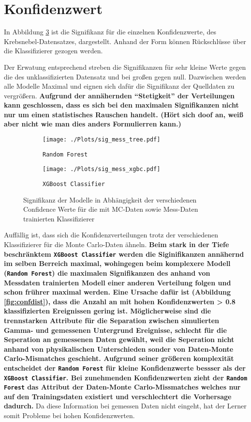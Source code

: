 \section{Konfidenzwert}
In Abbildung \ref{fig:signconf} ist die Signifikanz für die einzelnen Konfidenzwerte, des Krebsnebel-Datensatzes, dargestellt. 
Anhand der Form können Rückschlüsse über die Klassifizierer gezogen werden. 

Der Erwatung entsprechend streben die Signifikanzen für sehr kleine Werte gegen die des unklassifizierten Datensatz und bei großen gegen null.
Dazwischen werden alle Modelle Maximal und eignen sich dafür die Signifikanz der Quelldaten zu vergrößern.
\textbf{Aufgrund der annähernden \enquote{Stetigkeit} der Verteilungen kann geschlossen, dass es sich bei den maximalen Signifikanzen nicht nur  um einen statistisches Rauschen handelt. (Hört sich doof an, weiß aber nicht wie man dies anders Formulierren kann.)}
\begin{figure}[H]
  \centering
  \begin{subfigure}[b]{0.48\textwidth}
  \centering
  \texttt{[image: ./Plots/sig\_mess\_tree.pdf]}
  \caption{\texttt{Random Forest}}
  \label{fig:signconfMC}
\end{subfigure}
\begin{subfigure}[b]{0.48\textwidth}
  \centering
  \texttt{[image: ./Plots/sig\_mess\_xgbc.pdf]}
  \caption{\texttt{XGBoost Classifier}}
  \label{fig:signconfMESS}
\end{subfigure}
\caption{Signifikanz der Modelle in Abhängigkeit der verschiedenen Confidence Werte für die mit MC-Daten sowie Mess-Daten trainierten Klassifizierer}
\label{fig:signconf}
\end{figure}

Auffällig ist, dass sich die Konfidenzverteilungen trotz der verschiedenen Klassifizierer für die Monte Carlo-Daten ähneln.
\textbf{Beim stark in der Tiefe beschränktem \texttt{XGBoost Classifier} werden die Siginifikanzen annähernd im selben Berreich maximal, wohingegen beim komplexere Modell (\texttt{Random Forest}) die maximalen Signifikanzen des anhand von Messdaten trainierten Modell einer anderen Verteilung folgen und schon frührer maximal werden. 
Eine Ursache dafür ist (Abbildung \ref{fig:confdist}), dass die Anzahl an mit hohen Konfidenzwerten \num{> 0.8} klassifizierten Ereignissen gering ist. 
Möglicherweise sind die trennstarken Attribute für die Separation zwischen simulierten Gamma- und gemessenen Untergrund Ereignisse, schlecht für die Seperation an gemessenen Daten gewählt, weil die Seperation nicht anhand von physikalischen Unterschieden sonder von Daten-Monte Carlo-Mismatches geschieht.
Aufgrund seiner größeren komplexität entscheidet der \texttt{Random Forest} für kleine Konfidenzwerte bessser als der \texttt{XGBoost Classifier}. 
Bei zunehmenden Konfidenzwerten zieht der \texttt{Random Forest} das Attribut der Daten-Monte Carlo-Missmatches welches nur auf den Trainingsdaten existiert und verschlechtert die Vorhersage dadurch.}
Da diese Information bei gemessen Daten nicht eingeht, hat der Lerner somit Probleme bei hohen Konfidenzwerten.


